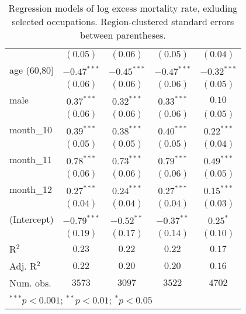 \begin{table}
\begin{center}
\begin{tabular}{l c c c c}
               & $(0.05)$      & $(0.06)$      & $(0.05)$      & $(0.04)$      \\
age (60,80]    & $-0.47^{***}$ & $-0.45^{***}$ & $-0.47^{***}$ & $-0.32^{***}$ \\
               & $(0.06)$      & $(0.06)$      & $(0.06)$      & $(0.05)$      \\
male           & $0.37^{***}$  & $0.32^{***}$  & $0.33^{***}$  & $0.10$        \\
               & $(0.06)$      & $(0.06)$      & $(0.06)$      & $(0.05)$      \\
month\_10      & $0.39^{***}$  & $0.38^{***}$  & $0.40^{***}$  & $0.22^{***}$  \\
               & $(0.05)$      & $(0.05)$      & $(0.05)$      & $(0.04)$      \\
month\_11      & $0.78^{***}$  & $0.73^{***}$  & $0.79^{***}$  & $0.49^{***}$  \\
               & $(0.06)$      & $(0.06)$      & $(0.06)$      & $(0.05)$      \\
month\_12      & $0.27^{***}$  & $0.24^{***}$  & $0.27^{***}$  & $0.15^{***}$  \\
               & $(0.04)$      & $(0.04)$      & $(0.04)$      & $(0.03)$      \\
(Intercept)    & $-0.79^{***}$ & $-0.52^{**}$  & $-0.37^{**}$  & $0.25^{*}$    \\
               & $(0.19)$      & $(0.17)$      & $(0.14)$      & $(0.10)$      \\
\hline
R$^2$          & $0.23$        & $0.22$        & $0.22$        & $0.17$        \\
Adj. R$^2$     & $0.22$        & $0.20$        & $0.20$        & $0.16$        \\
Num. obs.      & $3573$        & $3097$        & $3522$        & $4702$        \\
\hline
\multicolumn{5}{l}{\scriptsize{$^{***}p<0.001$; $^{**}p<0.01$; $^{*}p<0.05$}}
\end{tabular}
\caption{Regression models of log excess mortality rate, exluding selected occupations. Region-clustered standard errors between parentheses.}
\label{tab:altoccmodels}
\end{center}
\end{table}
